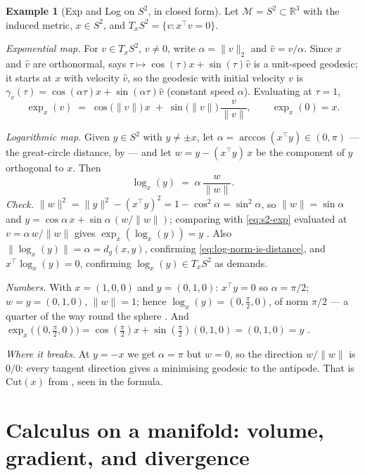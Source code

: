 \documentclass[11pt,a4paper]{report}
\theoremstyle{definition}
\newtheorem{example}[example]{Example}
\theoremstyle{remark}
\newcommand{\RR}{\mathbb R}
\begin{document}
\begin{example}[Exp and Log on $S^2$, in closed form]
\label{ex:s2-explog}
Let $\mathcal M=S^2\subset\RR^3$ with the induced metric, $x\in S^2$, and
$T_xS^2=\{v:x^\top v=0\}$.

\emph{Exponential map.} For $v\in T_xS^2$, $v\ne0$, write $\alpha=\|v\|_2$
and $\hat v=v/\alpha$. Since $x$ and $\hat v$ are orthonormal,
 says $\tau\mapsto\cos(\tau)x+\sin(\tau)\hat v$ is a
unit-speed geodesic; it starts at $x$ with velocity $\hat v$, so the
geodesic with initial velocity $v$ is $\gamma_v(\tau)=\cos(\alpha\tau)x+\sin(\alpha\tau)\hat v$
(constant speed $\alpha$). Evaluating at $\tau=1$,
\begin{equation}
\label{eq:s2-exp}
\exp_x(v) \;=\; \cos\bigl(\|v\|\bigr)\,x \;+\; \sin\bigl(\|v\|\bigr)\,\frac{v}{\|v\|} ,
\qquad \exp_x(0)=x .
\end{equation}

\emph{Logarithmic map.} Given $y\in S^2$ with $y\ne\pm x$, let
$\alpha=\arccos(x^\top y)\in(0,\pi)$ --- the great-circle distance, by
 --- and let
$w = y-(x^\top y)\,x$ be the component of $y$ orthogonal to $x$. Then
\begin{equation}
\label{eq:s2-log}
\log_x(y) \;=\; \alpha\,\frac{w}{\|w\|} .
\end{equation}
\emph{Check.} $\|w\|^2=\|y\|^2-(x^\top y)^2=1-\cos^2\alpha=\sin^2\alpha$, so
$\|w\|=\sin\alpha$ and $y=\cos\alpha\,x+\sin\alpha\,(w/\|w\|)$; comparing
with \eqref{eq:s2-exp} evaluated at $v=\alpha\,w/\|w\|$ gives
$\exp_x(\log_x(y))=y$ \checkmark. Also
$\|\log_x(y)\|=\alpha=d_g(x,y)$, confirming
\eqref{eq:log-norm-is-distance}, and $x^\top\log_x(y)=0$, confirming
$\log_x(y)\in T_xS^2$ as  demands.

\emph{Numbers.} With $x=(1,0,0)$ and $y=(0,1,0)$: $x^\top y=0$ so
$\alpha=\pi/2$; $w=y=(0,1,0)$, $\|w\|=1$; hence
$\log_x(y)=(0,\tfrac\pi2,0)$, of norm $\pi/2$ --- a quarter of the way round
the sphere \checkmark. And $\exp_x\bigl((0,\tfrac\pi2,0)\bigr)=\cos(\tfrac\pi2)x+\sin(\tfrac\pi2)(0,1,0)=(0,1,0)=y$ \checkmark.

\emph{Where it breaks.} At $y=-x$ we get $\alpha=\pi$ but $w=0$, so the
direction $w/\|w\|$ is $0/0$: every tangent direction gives a minimising
geodesic to the antipode. That is $\mathrm{Cut}(x)$ from
, seen in the formula.
\end{example}

\section{Calculus on a manifold: volume, gradient, and divergence}
\label{sec:manifold-calculus}
\end{document}
